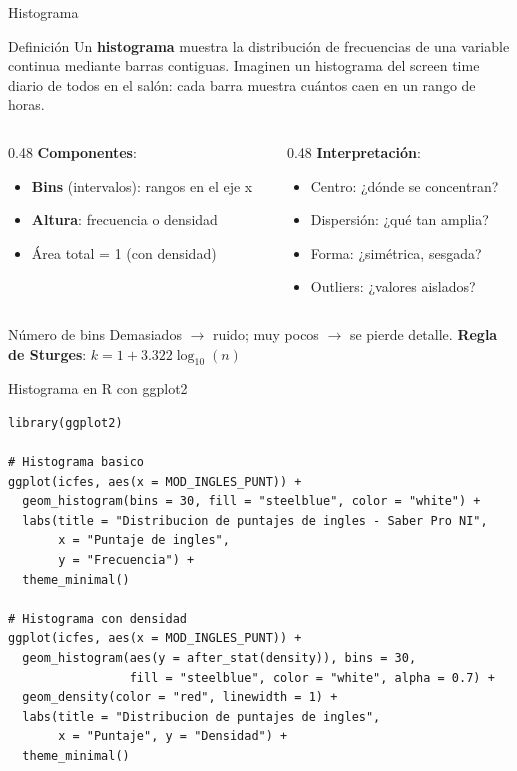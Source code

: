 \documentclass[aspectratio=169, 11pt]{beamer}
\begin{document}
\begin{frame}{Histograma}
\begin{block}{Definición}
Un \textbf{histograma} muestra la distribuci\'on de frecuencias de una variable continua mediante barras contiguas. Imaginen un histograma del screen time diario de todos en el sal\'on: cada barra muestra cu\'antos caen en un rango de horas.
\end{block}

\begin{columns}[T]
\begin{column}{0.48\textwidth}
\textbf{Componentes}:
\begin{itemize}
\item \textbf{Bins} (intervalos): rangos en el eje x
\item \textbf{Altura}: frecuencia o densidad
\item Área total = 1 (con densidad)
\end{itemize}
\end{column}
\begin{column}{0.48\textwidth}
\textbf{Interpretación}:
\begin{itemize}
\item Centro: ¿dónde se concentran?
\item Dispersión: ¿qué tan amplia?
\item Forma: ¿simétrica, sesgada?
\item Outliers: ¿valores aislados?
\end{itemize}
\end{column}
\end{columns}

\vspace{0.3em}
\begin{alertblock}{Número de bins}
Demasiados $\to$ ruido; muy pocos $\to$ se pierde detalle.
\textbf{Regla de Sturges}: $k = 1 + 3.322 \log_{10}(n)$
\end{alertblock}
\end{frame}

\begin{frame}[fragile]{Histograma en R con ggplot2}
\begin{lstlisting}
library(ggplot2)

# Histograma basico
ggplot(icfes, aes(x = MOD_INGLES_PUNT)) +
  geom_histogram(bins = 30, fill = "steelblue", color = "white") +
  labs(title = "Distribucion de puntajes de ingles - Saber Pro NI",
       x = "Puntaje de ingles",
       y = "Frecuencia") +
  theme_minimal()

# Histograma con densidad
ggplot(icfes, aes(x = MOD_INGLES_PUNT)) +
  geom_histogram(aes(y = after_stat(density)), bins = 30,
                 fill = "steelblue", color = "white", alpha = 0.7) +
  geom_density(color = "red", linewidth = 1) +
  labs(title = "Distribucion de puntajes de ingles",
       x = "Puntaje", y = "Densidad") +
  theme_minimal()
\end{lstlisting}
\end{frame}
\end{document}
